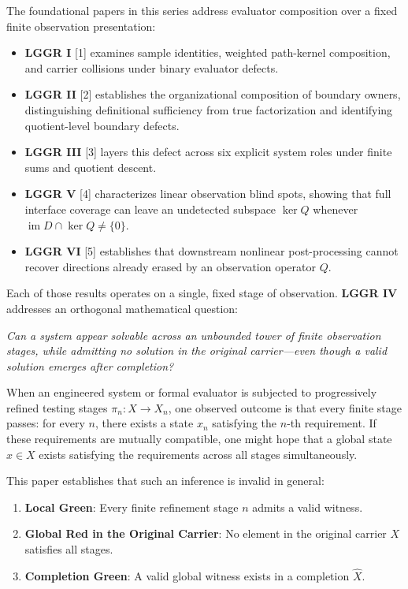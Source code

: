 \documentclass[
  11pt,
]{article}
\providecommand{\tightlist}{%
  \setlength{\itemsep}{0pt}\setlength{\parskip}{0pt}}
\theoremstyle{plain}
\theoremstyle{definition}\newtheorem{definition}[theorem]{Definition}
\theoremstyle{remark}\newtheorem*{remark}{Remark}
\renewenvironment{quote}{%
  \begin{mdframed}[linewidth=0pt,leftline=true,linecolor=obrule,
    rightline=false,topline=false,bottomline=false,
    innerleftmargin=1em,innerrightmargin=0.8em,innertopmargin=0.5em,
    innerbottommargin=0.5em,skipabove=0.6em,skipbelow=0.6em,
    backgroundcolor=obboxbg]\small}{\end{mdframed}}
\begin{document}
The foundational papers in this series address evaluator composition
over a fixed finite observation presentation:

\begin{itemize}
\tightlist
\item
  \textbf{LGGR I} {[}1{]} examines sample identities, weighted
  path-kernel composition, and carrier collisions under binary evaluator
  defects.
\item
  \textbf{LGGR II} {[}2{]} establishes the organizational composition of
  boundary owners, distinguishing definitional sufficiency from true
  factorization and identifying quotient-level boundary defects.
\item
  \textbf{LGGR III} {[}3{]} layers this defect across six explicit
  system roles under finite sums and quotient descent.
\item
  \textbf{LGGR V} {[}4{]} characterizes linear observation blind spots,
  showing that full interface coverage can leave an undetected subspace
  \(\ker Q\) whenever \(\operatorname{im} D \cap \ker Q \neq \{0\}\).
\item
  \textbf{LGGR VI} {[}5{]} establishes that downstream nonlinear
  post-processing cannot recover directions already erased by an
  observation operator \(Q\).
\end{itemize}

Each of those results operates on a single, fixed stage of observation.
\textbf{LGGR IV} addresses an orthogonal mathematical question:

\begin{quote}
\emph{Can a system appear solvable across an unbounded tower of finite
observation stages, while admitting no solution in the original
carrier---even though a valid solution emerges after completion?}
\end{quote}

When an engineered system or formal evaluator is subjected to
progressively refined testing stages \(\pi_n: X \to X_n\), one observed
outcome is that every finite stage passes: for every \(n\), there exists
a state \(x_n\) satisfying the \(n\)-th requirement. If these
requirements are mutually compatible, one might hope that a global state
\(x \in X\) exists satisfying the requirements across all stages
simultaneously.

This paper establishes that such an inference is invalid in general:

\begin{enumerate}
\def\labelenumi{\arabic{enumi}.}
\tightlist
\item
  \textbf{Local Green}: Every finite refinement stage \(n\) admits a
  valid witness.
\item
  \textbf{Global Red in the Original Carrier}: No element in the
  original carrier \(X\) satisfies all stages.
\item
  \textbf{Completion Green}: A valid global witness exists in a
  completion \(\widehat{X}\).
\end{enumerate}
\end{document}

